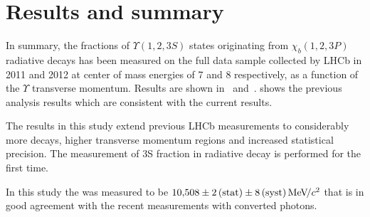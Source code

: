 \section{Results and summary}
\label{sec:results}

In summary, the fractions of $\Upsilon(1,2,3S)$ states originating from $\chi_b(1,2,3P)$ 
radiative decays has been measured on the full data sample collected by LHCb in 2011 and 2012 
at center of mass energies of 7 and 8 \tev respectively, as a function of the $\Upsilon$ 
transverse momentum. Results are shown in~
and~.
 shows the previous analysis results which
are consistent with the current results.






The results in this study extend previous LHCb measurements to considerably
more decays, higher transverse momentum regions and increased statistical
precision. The measurement of
\Y3S fraction in radiative \chibThreeP decay is performed for the first time.

In this study the \chiboneThreeP was measured to be $10{,}508 \pm 2\mathrm{\,(stat)} \pm 8\mathrm{\,(syst)} {\mathrm{\,Me\kern -0.1em V\!/}c^2}$ that
is in good agreement with the recent \lhcb measurements with converted photons.


